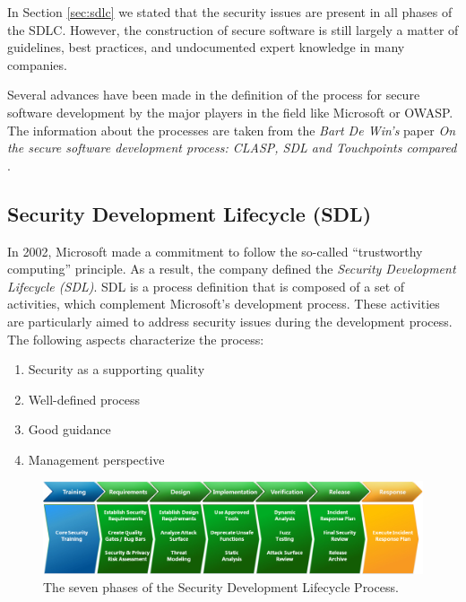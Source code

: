 \documentclass[12pt,a4,twoside]{article}
\begin{document}
In Section \ref{sec:sdlc} we stated that the security issues are present in all phases of the SDLC. However, the construction of secure software is still largely a matter of guidelines, best practices, and undocumented expert knowledge in many companies. \cite{on_secure_software}

Several advances have been made in the definition of the process for secure software development by the major players in the field like Microsoft or OWASP. The information about the processes are taken from the \textit{Bart De Win's} paper \textit{On the secure software development process: CLASP, SDL and Touchpoints compared} \cite{on_secure_software}.

\subsection{Security Development Lifecycle (SDL) \cite{on_secure_software}}

In 2002, Microsoft made a commitment to follow the so-called ``trustworthy computing'' principle. As a result, the company defined the \textit{Security Development Lifecycle (SDL)}. SDL is a process definition that is composed of a set of activities, which complement Microsoft's development process. These activities are particularly aimed to address security issues during the development process. The following aspects characterize the process:

\begin{enumerate}
    \item Security as a supporting quality
    \item Well-defined process
    \item Good guidance
    \item Management perspective
\end{enumerate}

\begin{figure}[h]
\centering
\includegraphics[width=1\textwidth]{figures/sdl_steps.jpg}
\caption{The seven phases of the Security Development Lifecycle Process. \cite{sdl_wiki}}
\label{fig:sdl_phases}
\end{figure}
\end{document}
